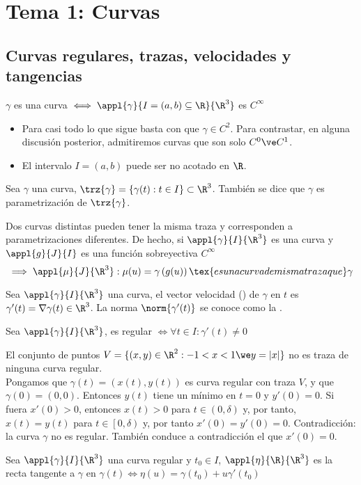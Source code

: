 \section{Tema 1: Curvas}

\subsection{Curvas regulares, trazas, velocidades y tangencias}
\begin{defn}[Curva]
	$\gamma$ es una curva $\iff \appl{\gamma}{I=(a,b)\subseteq\R}{\R^3}$ es $C^{\infty}$
	\begin{itemize}
		\item Para casi todo lo que sigue basta con que $\gamma \in C^2$. Para contrastar, en alguna discusión posterior, admitiremos curvas que son solo $C^0 \ve C^1$.
		\item El intervalo $I = (a,b)$ puede ser no acotado en $\R$.
	\end{itemize}
\end{defn}
\begin{defn}[Traza]
	Sea $\gamma$ una curva, $\trz{\gamma}=\{\gamma(t):t\in I\}\subset \R^3$. También se dice que $\gamma$ es parametrización de $\trz{\gamma}$.
\end{defn}

\begin{obs}
	Dos curvas distintas pueden tener la misma traza y corresponden a parametrizaciones diferentes. De hecho, si $\appl{\gamma}{I}{\R^3}$ es una curva y $\appl{g}{J}{I}$ es una función sobreyectiva $C^{\infty}$
	\[\implies \appl{\mu}{J}{\R^3} : \mu(u)=\gamma\left(g(u)\right)\tex{ es una curva de misma traza que } \gamma\]
\end{obs}
\begin{defn}
	Sea $\appl{\gamma}{I}{\R^3}$ una curva, el vector velocidad () de $\gamma$ en $t$ es $\gamma'(t)=\nabla\gamma(t)\in \R^3$. La norma $\norm{\gamma'(t)}$ se conoce como la .
\end{defn}
\begin{defn}
	Sea $\appl{\gamma}{I}{\R^3}$, es regular $\iff \forall t \in I : \gamma'(t)\ne 0$
\end{defn}
\begin{ejem}
	El conjunto de puntos $V=\{(x, y)\in \R^2:-1<x<1\we y=|x|\}$ no es traza de ninguna curva regular.\\
	\indent Pongamos que $\gamma(t)=(x(t), y(t))$ es curva regular con traza $V$, y que $\gamma(0)=(0,0)$. Entonces $y(t)$ tiene un mínimo en $t = 0$ y $y'(0) = 0$. Si fuera $x'(0) > 0$, entonces $x(t) > 0$ para $t \in (0, \delta)$ y, por tanto, $x(t) =y(t)$ para $t \in \left[0, \delta\right)$ y, por tanto $x'(0) = y'(0) = 0$. Contradicción: la curva $\gamma$ no es regular. También conduce a contradicción el que $x'(0) = 0$.
\end{ejem}
\begin{defn}
	Sea $\appl{\gamma}{I}{\R^3}$ una curva regular y $t_0\in I$, $\appl{\eta}{\R}{\R^3}$ es la recta tangente a $\gamma$ en $\gamma(t) \iff \eta(u)=\gamma(t_0)+u\gamma'(t_0)$
\end{defn}

